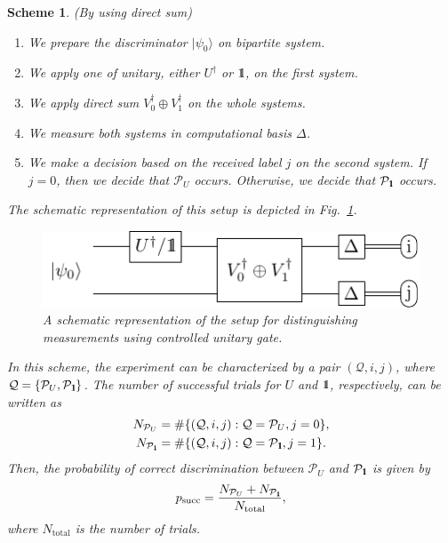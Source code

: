 \documentclass[preprint,12pt, a4paper, dvipsnames]{elsarticle}
\newcommand{\ket}[1]{\ensuremath{|#1\rangle}}
\newcommand{\bra}[1]{\ensuremath{\langle#1|}}
\newcommand{\ketbra}[2]{\ensuremath{\ket{#1}\bra{#2}}}
\newcommand{\proj}[1]{\ensuremath{\ketbra{#1}{#1}}}
\newcommand{\1}{{\rm 1\hspace{-0.9mm}l}}
\newcommand{\Id}{{\rm 1\hspace{-0.9mm}l}}
\newcommand{\PP}{\mathcal{P}}
\newtheorem{scheme}{Scheme}
\begin{document}
\begin{scheme}(By using direct sum)



	\begin{enumerate}
		\item We prepare the discriminator $\ket{\psi_{0}}$ on bipartite
		system.
		\item We apply one of unitary,   either $U^\dagger$ or
		$\Id$, on the first system.
		\item We apply direct sum $V_0^\dagger \oplus V_1^\dagger$ on the whole systems.
		\item We measure both systems in computational basis $\Delta$.
		\item We make a decision based on the received label $j$ on the second system. If $j=0$, then we
		decide that $\PP_U$ occurs. Otherwise, we decide that $\PP_{\Id}$ occurs.
	\end{enumerate}

	The schematic representation of this setup is depicted in
	Fig.~\ref{fig:controlled}.
	\begin{figure}[h!]
		\centering
		\includegraphics[scale=1.5]{pics/controlled_unitary}

		\caption{ A schematic representation of the setup for distinguishing
			measurements using controlled unitary gate.
		}\label{fig:controlled}
	\end{figure}

	In this scheme, the experiment can be characterized by a pair $(\mathcal{Q}, i,j)$, where $\mathcal{Q} = \{ \PP_{U}, \PP_{\Id} \}$. The number of successful trials for $U$ and $\Id$, respectively, can be written  as
	\begin{eqnarray}
	N_{\PP_U} &= \#\{(\mathcal{Q},  i, j): \mathcal{Q} = \PP_U, j = 0\}, \\
	N_{\PP_\Id} &= \#\{(\mathcal{Q},  i, j): \mathcal{Q} = \PP_\Id, j = 1\}.
	\end{eqnarray}
	Then, the probability of correct discrimination between $\PP_{U} $ and $\PP_\Id$ is given by
	\begin{equation}
	p_{\text{succ}} = \frac{N_{\PP_{U}} + N_{\PP_{\Id}}}{N_{\text{total}}},
	\end{equation}
	where $N_{\text{total}}$ is the number of trials.
\end{scheme}
\end{document}
